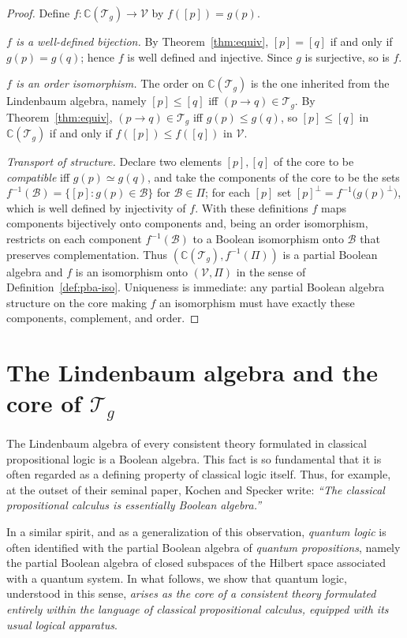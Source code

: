 \documentclass{article}   	%
\theoremstyle{plain}
\theoremstyle{definition}
\theoremstyle{remark}
\begin{document}
\begin{proof}
Define $f:\mathbb C(\mathcal T_g)\to\mathcal V$ by $f([p])=g(p)$.

\emph{$f$ is a well-defined bijection.}
By Theorem~\ref{thm:equiv}, $[p]=[q]$ if and only if $g(p)=g(q)$; hence $f$ is
well defined and injective.
Since $g$ is surjective, so is $f$.

\emph{$f$ is an order isomorphism.}
The order on $\mathbb C(\mathcal T_g)$ is the one inherited from the Lindenbaum
algebra, namely $[p]\le[q]$ iff $(p\to q)\in\mathcal T_g$.
By Theorem~\ref{thm:equiv}, $(p\to q)\in\mathcal T_g$ iff $g(p)\le g(q)$, so
$[p]\le[q]$ in $\mathbb C(\mathcal T_g)$ if and only if $f([p])\le f([q])$ in
$\mathcal V$.

\emph{Transport of structure.}
Declare two elements $[p],[q]$ of the core to be \emph{compatible} iff
$g(p)\simeq g(q)$, and take the components of the core to be the sets
$f^{-1}(\mathcal B)=\{[p]:g(p)\in\mathcal B\}$ for $\mathcal B\in\Pi$;
for each $[p]$ set $[p]^\perp=f^{-1}\!\bigl(g(p)^\perp\bigr)$, which is
well defined by injectivity of $f$.
With these definitions $f$ maps components bijectively onto components and, being
an order isomorphism, restricts on each component $f^{-1}(\mathcal B)$ to a Boolean
isomorphism onto $\mathcal B$ that preserves complementation.
Thus $(\mathbb C(\mathcal T_g),f^{-1}(\Pi))$ is a partial Boolean algebra and $f$
is an isomorphism onto $(\mathcal V,\Pi)$ in the sense of
Definition~\ref{def:pba-iso}.
Uniqueness is immediate: any partial Boolean algebra structure on the core making
$f$ an isomorphism must have exactly these components, complement, and order.
\end{proof}

\section{The Lindenbaum algebra and the core of $\mathcal T_g$}
\label{sec:compare}

The Lindenbaum algebra of every consistent theory formulated in classical
propositional logic is a Boolean algebra.
This fact is so fundamental that it is often regarded as a defining
property of classical logic itself.
Thus, for example, at the outset of their seminal paper,
Kochen and Specker \cite{KS} write:
\emph{``The classical propositional calculus is essentially Boolean algebra.''}

In a similar spirit, and as a generalization of this observation,
\emph{quantum logic} is often identified with the partial Boolean algebra
of \emph{quantum propositions}, namely the partial Boolean algebra of closed
subspaces of the Hilbert space associated with a quantum system.
In what follows, we show that quantum logic, understood in this sense,
\emph{arises as the core of a consistent theory formulated entirely within
the language of classical propositional calculus, equipped with its usual
logical apparatus}.
\end{document}
